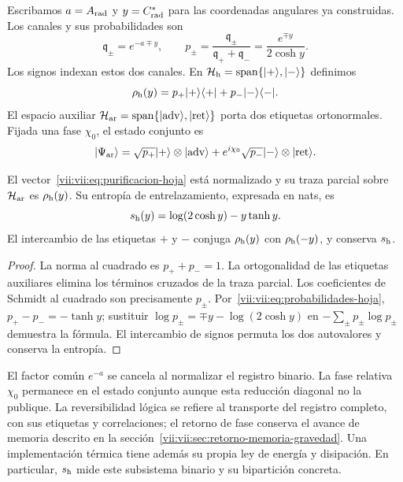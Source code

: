 Escribamos \(a=A_{\rm rad}\) y \(y=C^*_{\rm rad}\) para las
coordenadas angulares ya construidas. Los canales y sus probabilidades son
\begin{equation}
 \mathfrak q_\pm=e^{-a\mp y},\qquad
 p_\pm=\frac{\mathfrak q_\pm}{\mathfrak q_++\mathfrak q_-}
       =\frac{e^{\mp y}}{2\cosh y}.
 \label{vii:vii:eq:probabilidades-hoja}
\end{equation}
Los signos indexan estos dos canales. En
\(\mathcal H_{\rm h}=\operatorname{span}\{|+\rangle,|-\rangle\}\)
definimos
\[
 \rho_{\rm h}(y)=p_+|+\rangle\langle+|+p_-|-\rangle\langle-|.
\]
El espacio auxiliar
\(\mathcal H_{\rm ar}=\operatorname{span}
\{|\mathrm{adv}\rangle,|\mathrm{ret}\rangle\}\)
porta dos etiquetas ortonormales. Fijada una fase \(\chi_0\), el estado
conjunto es
\begin{equation}
 |\Psi_{\rm ar}\rangle
 =\sqrt{p_+}|+\rangle\otimes|\mathrm{adv}\rangle
  +e^{i\chi_0}\sqrt{p_-}|-\rangle\otimes|\mathrm{ret}\rangle.
 \label{vii:vii:eq:purificacion-hoja}
\end{equation}

\begin{proposition}
\label{vii:vii:prop:purificacion-hoja}
El vector~\eqref{vii:vii:eq:purificacion-hoja} está normalizado y su traza
parcial sobre \(\mathcal H_{\rm ar}\) es \(\rho_{\rm h}(y)\).
Su entropía de entrelazamiento, expresada en nats, es
\begin{equation}
 s_{\rm h}(y)=\log(2\cosh y)-y\tanh y.
 \label{vii:vii:eq:entropia-hoja}
\end{equation}
El intercambio de las etiquetas \(+\) y \(-\) conjuga
\(\rho_{\rm h}(y)\) con \(\rho_{\rm h}(-y)\), y conserva
\(s_{\rm h}\).
\end{proposition}
\begin{proof}
La norma al cuadrado es \(p_++p_-=1\). La ortogonalidad de las
etiquetas auxiliares elimina los términos cruzados de la traza parcial.
Los coeficientes de Schmidt al cuadrado son precisamente \(p_\pm\).
Por~\eqref{vii:vii:eq:probabilidades-hoja},
\(p_+-p_-=-\tanh y\); sustituir
\(\log p_\pm=\mp y-\log(2\cosh y)\) en
\(-\sum_\pm p_\pm\log p_\pm\) demuestra la fórmula.
El intercambio de signos permuta los dos autovalores y conserva la entropía.
\end{proof}

El factor común \(e^{-a}\) se cancela al normalizar el registro binario.
La fase relativa \(\chi_0\) permanece en el estado conjunto aunque esta
reducción diagonal no la publique. La reversibilidad lógica se refiere
al transporte del registro completo, con sus etiquetas y correlaciones;
el retorno de fase conserva el avance de memoria descrito en la
sección~\ref{vii:vii:sec:retorno-memoria-gravedad}. Una implementación térmica
tiene además su propia ley de energía y disipación. En particular,
\(s_{\rm h}\) mide este subsistema binario y su bipartición concreta.

